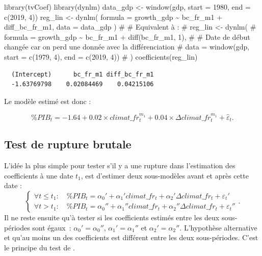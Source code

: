 \documentclass[
  a4paper,
  DIV=11,
  numbers=noendperiod,
  french]{scrartcl}
\newenvironment{Shaded}{\begin{snugshade}}{\end{snugshade}}
\newcommand{\AttributeTok}[1]{\textcolor[rgb]{0.40,0.45,0.13}{#1}}
\newcommand{\CommentTok}[1]{\textcolor[rgb]{0.37,0.37,0.37}{#1}}
\newcommand{\DecValTok}[1]{\textcolor[rgb]{0.68,0.00,0.00}{#1}}
\newcommand{\FunctionTok}[1]{\textcolor[rgb]{0.28,0.35,0.67}{#1}}
\newcommand{\NormalTok}[1]{\textcolor[rgb]{0.00,0.23,0.31}{#1}}
\newcommand{\OtherTok}[1]{\textcolor[rgb]{0.00,0.23,0.31}{#1}}
\newcommand{\SpecialCharTok}[1]{\textcolor[rgb]{0.37,0.37,0.37}{#1}}
\newcommand\1{{\mathds 1}}
\theoremstyle{remark}
\begin{document}
\begin{Shaded}
\begin{Highlighting}[]
\FunctionTok{library}\NormalTok{(tvCoef)}
\FunctionTok{library}\NormalTok{(dynlm)}
\NormalTok{data\_gdp }\OtherTok{\textless{}{-}} \FunctionTok{window}\NormalTok{(gdp, }\AttributeTok{start =} \DecValTok{1980}\NormalTok{, }\AttributeTok{end =} \FunctionTok{c}\NormalTok{(}\DecValTok{2019}\NormalTok{, }\DecValTok{4}\NormalTok{))}
\NormalTok{reg\_lin }\OtherTok{\textless{}{-}} \FunctionTok{dynlm}\NormalTok{(}
  \AttributeTok{formula =}\NormalTok{ growth\_gdp }\SpecialCharTok{\textasciitilde{}}\NormalTok{ bc\_fr\_m1 }\SpecialCharTok{+}\NormalTok{ diff\_bc\_fr\_m1,}
  \AttributeTok{data =}\NormalTok{ data\_gdp}
\NormalTok{)}
\CommentTok{\# \# Equivalent à :}
\CommentTok{\# reg\_lin \textless{}{-} dynlm(}
\CommentTok{\#   formula = growth\_gdp \textasciitilde{} bc\_fr\_m1 + diff(bc\_fr\_m1, 1),}
\CommentTok{\#   \# Date de début changée car on perd une donnée avec la différenciation}
\CommentTok{\#   data = window(gdp, start = c(1979, 4), end = c(2019, 4))}
\CommentTok{\# )}
\FunctionTok{coefficients}\NormalTok{(reg\_lin)}
\end{Highlighting}
\end{Shaded}

\begin{verbatim}
  (Intercept)      bc_fr_m1 diff_bc_fr_m1 
  -1.63769798    0.02084469    0.04215106 
\end{verbatim}

Le modèle estimé est donc :

\[\% PIB_t=-1.64 + 0.02\times climat\_fr_t^{m_1} + 0.04\times \Delta climat\_fr_t^{m_1}+{\hat\varepsilon}_t.\]

\subsection{Test de rupture brutale}\label{sec-test-baiperron}

L'idée la plus simple pour tester s'il y a une rupture dans l'estimation
des coefficients à une date \(t_1\), est d'estimer deux sous-modèles
avant et après cette date : \[
\begin{cases}
\forall t \leq t_1 :\quad \% PIB_t = \alpha_0' + \alpha_1' climat\_fr_t + \alpha_2' \Delta climat\_fr_t + \varepsilon_t' \\
\forall t > t_1 :\quad \% PIB_t = \alpha_0'' + \alpha_1'' climat\_fr_t + \alpha_2'' \Delta climat\_fr_t + \varepsilon_t''
\end{cases}.
\] Il ne reste ensuite qu'à tester si les coefficients estimés entre les
deux sous-périodes sont égaux~: \(\alpha_0' = \alpha_0''\),
\(\alpha_1' = \alpha_1''\) et \(\alpha_2' = \alpha_2''.\) L'hypothèse
alternative et qu'au moins un des coefficients est différent entre les
deux sous-périodes. C'est le principe du test de \textcite{chowtest}.
\end{document}
